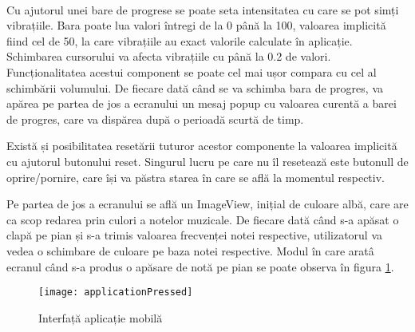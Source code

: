 \documentclass[../IoMusT.tex]{subfiles}
\begin{document}
\\
\par Cu ajutorul unei bare de progrese se poate seta intensitatea cu care se pot simți vibrațiile. Bara poate lua valori întregi de la 0 până la 100, valoarea implicită fiind cel de 50, la care vibrațiile au exact valorile calculate în aplicație. Schimbarea cursorului va afecta vibrațiile cu
 până la 0.2 de valori. Funcționalitatea acestui component se poate cel mai ușor compara cu cel al schimbării volumului. De fiecare dată când se va schimba bara de progres, va apărea pe partea de jos a ecranului un mesaj popup cu valoarea curentă a barei de progres, care va dispărea după o perioadă scurtă de timp.
\\
\par Există și posibilitatea resetării tuturor acestor componente la valoarea implicită cu ajutorul butonului reset. Singurul lucru pe care nu îl resetează este butonull de oprire/pornire, care își va păstra starea în care se află la momentul respectiv.
\\
\par Pe partea de jos a ecranului se află un ImageView, inițial de culoare albă, care are ca scop redarea prin culori a notelor muzicale. De fiecare dată când s-a apăsat o clapă pe pian și s-a trimis valoarea frecvenței notei respective, utilizatorul va vedea o schimbare de culoare pe baza notei respective. Modul în care aratâ ecranul când s-a produs o apăsare de notă pe pian se poate observa în figura \ref{fig:applicationPressed}.
\begin{figure}[h]
\begin{center}
\texttt{[image: applicationPressed]}
\caption{Interfață aplicație mobilă}
\label{fig:applicationPressed}
\end{center}
\end{figure}
\end{document}
